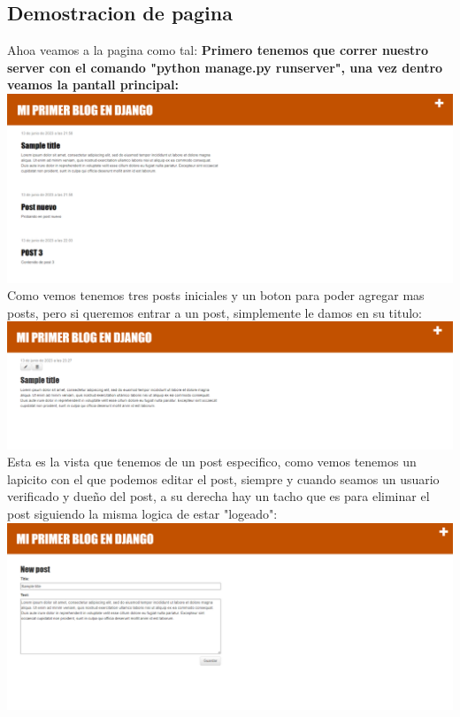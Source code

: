\documentclass{article}
\begin{document}
        \subsection{Demostracion de pagina}
        Ahoa veamos a la pagina como tal:\newline\newline
        \textbf{Primero tenemos que correr nuestro server con el comando "python manage.py runserver", una vez dentro veamos la pantall principal:} \newline \newline \newline \newline 
        \includegraphics[width=16cm]{img/paginaInicial.png}
        Como vemos tenemos tres posts iniciales y un boton para poder agregar mas posts, pero si queremos entrar a un post, simplemente le damos en su titulo:
        \newline\newline
        \includegraphics[width=16cm]{img/detallesPOST.png}
        Esta es la vista que tenemos de un post especifico, como vemos tenemos un lapicito con el que podemos editar el post, siempre y cuando seamos un usuario verificado y dueño del post, a su derecha hay un tacho que es para eliminar el post siguiendo la misma logica de estar "logeado":
        \newline\newline
        \includegraphics[width=16cm]{img/edicionPosts.png}
\end{document}
